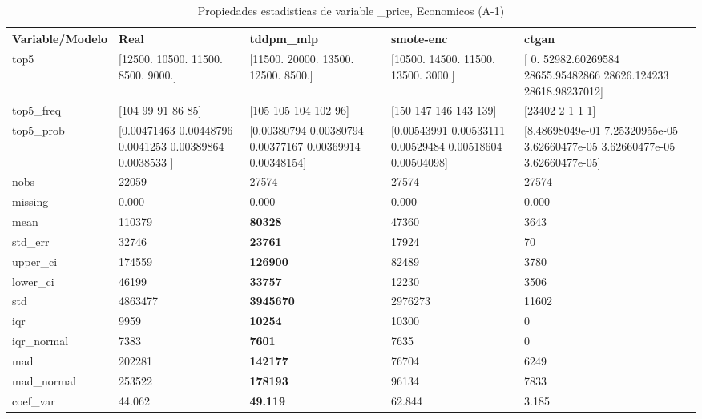\begin{table}[H]
\centering
\fontsize{8}{14}\selectfont
\caption{Propiedades  estadisticas de variable \_price, Economicos (A-1)}
\label{table-stats-economicos-a-1-_price}
\begin{tabular}{|l|m{10em}|m{10em}|m{10em}|m{10em}|}
\hline
 \rowcolor[gray]{0.8}
Variable/Modelo & Real & tddpm\_mlp & smote-enc & ctgan \\
\hline top5 & [12500. 10500. 11500.  8500.  9000.] & [11500. 20000. 13500. 12500.  8500.] & [10500. 14500. 11500. 13500.  3000.] & [    0.         52982.60269584 28655.95482866 28626.124233
 28618.98237012] \\
\hline top5\_freq & [104  99  91  86  85] & [105 105 104 102  96] & [150 147 146 143 139] & [23402     2     1     1     1] \\
\hline top5\_prob & [0.00471463 0.00448796 0.0041253  0.00389864 0.0038533 ] & [0.00380794 0.00380794 0.00377167 0.00369914 0.00348154] & [0.00543991 0.00533111 0.00529484 0.00518604 0.00504098] & [8.48698049e-01 7.25320955e-05 3.62660477e-05 3.62660477e-05
 3.62660477e-05] \\
\hline nobs & 22059 & 27574 & 27574 & 27574 \\
\hline missing & 0.000 & 0.000 & 0.000 & 0.000 \\
\hline mean & 110379 & \bfseries 80328 & 47360 & \cellcolor[rgb]{0.9, 0.54, 0.52} 3643 \\
\hline std\_err & 32746 & \bfseries 23761 & 17924 & \cellcolor[rgb]{0.9, 0.54, 0.52} 70 \\
\hline upper\_ci & 174559 & \bfseries 126900 & 82489 & \cellcolor[rgb]{0.9, 0.54, 0.52} 3780 \\
\hline lower\_ci & 46199 & \bfseries 33757 & 12230 & \cellcolor[rgb]{0.9, 0.54, 0.52} 3506 \\
\hline std & 4863477 & \bfseries 3945670 & 2976273 & \cellcolor[rgb]{0.9, 0.54, 0.52} 11602 \\
\hline iqr & 9959 & \bfseries 10254 & 10300 & \cellcolor[rgb]{0.9, 0.54, 0.52} 0 \\
\hline iqr\_normal & 7383 & \bfseries 7601 & 7635 & \cellcolor[rgb]{0.9, 0.54, 0.52} 0 \\
\hline mad & 202281 & \bfseries 142177 & 76704 & \cellcolor[rgb]{0.9, 0.54, 0.52} 6249 \\
\hline mad\_normal & 253522 & \bfseries 178193 & 96134 & \cellcolor[rgb]{0.9, 0.54, 0.52} 7833 \\
\hline coef\_var & 44.062 & \bfseries 49.119 & 62.844 & \cellcolor[rgb]{0.9, 0.54, 0.52} 3.185 \\

\end{tabular}
\end{table}
